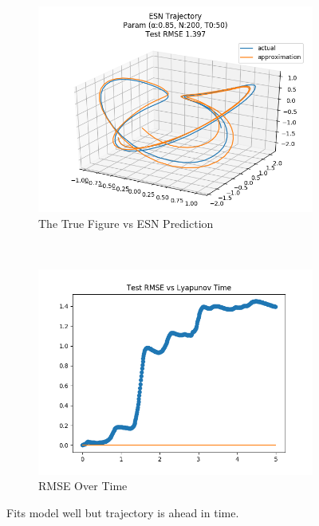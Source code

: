 \documentclass{article}
\begin{document}
\begin{figure}[H]
    \centering
    \begin{subfigure}[b]{0.45\textwidth}
        \includegraphics[width=\textwidth]{doc/paper/images/lorenz/rank_4_param_300_fit.png}
        \caption{The True Figure vs ESN Prediction}
        \label{fig:lorenz_r4_fit}
    \end{subfigure}
    ~
    \begin{subfigure}[b]{0.45\textwidth}
        \includegraphics[width=\textwidth]{doc/paper/images/lorenz/rank_4_param_300_rmse.png}
        \caption{RMSE Over Time}
        \label{fig:lorenz_r4_rmse}
    \end{subfigure}
    \caption{Fits model well but trajectory is ahead in time.}
    \label{fig:lorenz_r4}
\end{figure}
\end{document}

